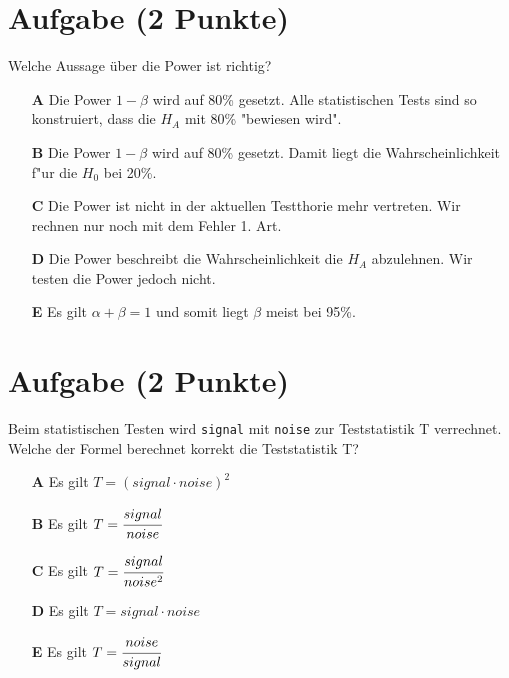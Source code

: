 \documentclass[a4paper, 10pt]{scrartcl}\usepackage[]{graphicx}\usepackage[]{xcolor}
\begin{document}
\section{Aufgabe \hfill (2 Punkte)}

Welche Aussage {\"u}ber die Power ist richtig?



\begin{enumerate}
\item [\textbf{A} \msquare] Die Power $1-\beta$ wird auf 80\% gesetzt. Alle statistischen Tests sind so konstruiert, dass die $H_A$ mit 80\% "bewiesen wird".
\item [\textbf{B} \msquare] Die Power $1-\beta$ wird auf 80\% gesetzt. Damit liegt die Wahrscheinlichkeit f{"u}r die $H_0$ bei 20\%.
\item [\textbf{C} \msquare] Die Power ist nicht in der aktuellen Testthorie mehr vertreten. Wir rechnen nur noch mit dem Fehler 1. Art.
\item [\textbf{D} \msquare] Die Power beschreibt die Wahrscheinlichkeit die $H_A$ abzulehnen. Wir testen die Power jedoch nicht.
\item [\textbf{E} \msquare] Es gilt $\alpha + \beta = 1$ und somit liegt $\beta$ meist bei 95\%.
\end{enumerate}

\section{Aufgabe \hfill (2 Punkte)}

Beim statistischen Testen wird \texttt{signal} mit \texttt{noise} zur
Teststatistik T verrechnet. Welche der Formel berechnet korrekt die
Teststatistik T?



\begin{enumerate}
\item [\textbf{A} \msquare] Es gilt $T = (signal \cdot noise)^2$
\item [\textbf{B} \msquare] Es gilt $T = \cfrac{signal}{noise}$
\item [\textbf{C} \msquare] Es gilt $T = \cfrac{signal}{noise^2}$
\item [\textbf{D} \msquare] Es gilt $T = signal \cdot noise$
\item [\textbf{E} \msquare] Es gilt $T = \cfrac{noise}{signal}$
\end{enumerate}

\end{document}
